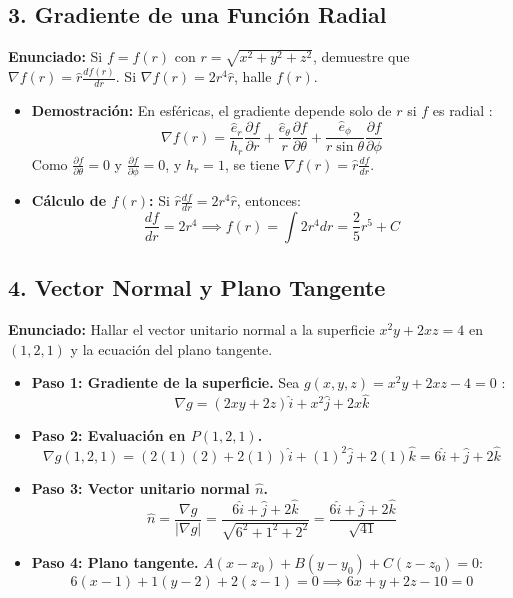 \documentclass[a4paper]{article}
\begin{document}
\subsection*{3. Gradiente de una Función Radial}
\textbf{Enunciado:} Si $f = f(r)$ con $r = \sqrt{x^2 + y^2 + z^2}$, demuestre que $\nabla f(r) = \hat{r} \frac{df(r)}{dr}$. Si $\nabla f(r) = 2r^4\hat{r}$, halle $f(r)$.

\begin{itemize}
    \item \textbf{Demostración:} En esféricas, el gradiente depende solo de $r$ si $f$ es radial \cite{82}:
    \begin{equation}
        \nabla f(r) = \frac{\hat{e}_r}{h_r} \frac{\partial f}{\partial r} + \frac{\hat{e}_\theta}{r} \frac{\partial f}{\partial \theta} + \frac{\hat{e}_\phi}{r \sin \theta} \frac{\partial f}{\partial \phi}
    \end{equation}
    Como $\frac{\partial f}{\partial \theta} = 0$ y $\frac{\partial f}{\partial \phi} = 0$, y $h_r = 1$, se tiene $\nabla f(r) = \hat{r} \frac{df}{dr}$.
    \item \textbf{Cálculo de $f(r)$:} Si $\hat{r} \frac{df}{dr} = 2r^4\hat{r}$, entonces:
    \begin{equation}
        \frac{df}{dr} = 2r^4 \implies f(r) = \int 2r^4 dr = \frac{2}{5}r^5 + C
    \end{equation}
\end{itemize}

\subsection*{4. Vector Normal y Plano Tangente}
\textbf{Enunciado:} Hallar el vector unitario normal a la superficie $x^2y + 2xz = 4$ en $(1, 2, 1)$ y la ecuación del plano tangente.

\begin{itemize}
    \item \textbf{Paso 1: Gradiente de la superficie.} Sea $g(x,y,z) = x^2y + 2xz - 4 = 0$ \cite{82}:
    \begin{equation}
        \nabla g = (2xy + 2z)\hat{i} + x^2\hat{j} + 2x\hat{k}
    \end{equation}
    \item \textbf{Paso 2: Evaluación en $P(1, 2, 1)$.}
    \begin{equation}
        \nabla g(1,2,1) = (2(1)(2) + 2(1))\hat{i} + (1)^2\hat{j} + 2(1)\hat{k} = 6\hat{i} + \hat{j} + 2\hat{k}
    \end{equation}
    \item \textbf{Paso 3: Vector unitario normal $\hat{n}$.}
    \begin{equation}
        \hat{n} = \frac{\nabla g}{|\nabla g|} = \frac{6\hat{i} + \hat{j} + 2\hat{k}}{\sqrt{6^2 + 1^2 + 2^2}} = \frac{6\hat{i} + \hat{j} + 2\hat{k}}{\sqrt{41}}
    \end{equation}
    \item \textbf{Paso 4: Plano tangente.} $A(x-x_0) + B(y-y_0) + C(z-z_0) = 0$:
    \begin{equation}
        6(x-1) + 1(y-2) + 2(z-1) = 0 \implies 6x + y + 2z - 10 = 0
    \end{equation}
\end{itemize}
\end{document}
